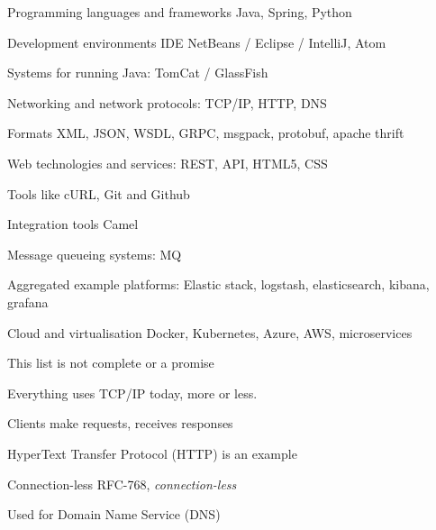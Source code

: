 \documentclass[Screen16to9,17pt]{foils}
\begin{document}
\begin{list2}
\item Programming languages and frameworks Java, Spring, Python
\item Development environments IDE NetBeans / Eclipse / IntelliJ, Atom
\item Systems for running Java: TomCat / GlassFish
\item Networking and network protocols: TCP/IP, HTTP, DNS
\item Formats XML, JSON, WSDL, GRPC, msgpack, protobuf, apache thrift
\item Web technologies and services: REST, API, HTML5, CSS
\item Tools like cURL, Git and Github
\item Integration tools Camel
\item Message queueing systems: MQ
\item Aggregated example platforms: Elastic stack, logstash, elasticsearch, kibana, grafana
\item Cloud and virtualisation Docker, Kubernetes, Azure, AWS, microservices
\end{list2}

\centerline{This list is not complete or a promise }







\begin{list2}
\item Everything uses TCP/IP today, more or less.
\item Clients make requests, receives responses
\item HyperText Transfer Protocol (HTTP) is an example
\end{list2}



\begin{list1}
\item Connection-less RFC-768, \emph{connection-less}
\item Used for Domain Name Service (DNS)
\end{list1}

\end{document}
